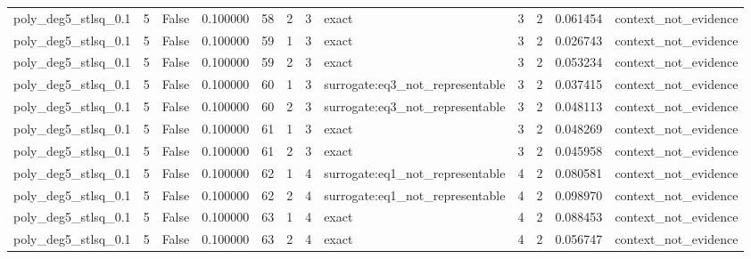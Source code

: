 \begin{tabular}{lrrrrrrlrrrl}
poly\_deg5\_stlsq\_0.1 & 5 & False & 0.100000 & 58 & 2 & 3 & exact & 3 & 2 & 0.061454 & context\_not\_evidence \\
poly\_deg5\_stlsq\_0.1 & 5 & False & 0.100000 & 59 & 1 & 3 & exact & 3 & 2 & 0.026743 & context\_not\_evidence \\
poly\_deg5\_stlsq\_0.1 & 5 & False & 0.100000 & 59 & 2 & 3 & exact & 3 & 2 & 0.053234 & context\_not\_evidence \\
poly\_deg5\_stlsq\_0.1 & 5 & False & 0.100000 & 60 & 1 & 3 & surrogate:eq3\_not\_representable & 3 & 2 & 0.037415 & context\_not\_evidence \\
poly\_deg5\_stlsq\_0.1 & 5 & False & 0.100000 & 60 & 2 & 3 & surrogate:eq3\_not\_representable & 3 & 2 & 0.048113 & context\_not\_evidence \\
poly\_deg5\_stlsq\_0.1 & 5 & False & 0.100000 & 61 & 1 & 3 & exact & 3 & 2 & 0.048269 & context\_not\_evidence \\
poly\_deg5\_stlsq\_0.1 & 5 & False & 0.100000 & 61 & 2 & 3 & exact & 3 & 2 & 0.045958 & context\_not\_evidence \\
poly\_deg5\_stlsq\_0.1 & 5 & False & 0.100000 & 62 & 1 & 4 & surrogate:eq1\_not\_representable & 4 & 2 & 0.080581 & context\_not\_evidence \\
poly\_deg5\_stlsq\_0.1 & 5 & False & 0.100000 & 62 & 2 & 4 & surrogate:eq1\_not\_representable & 4 & 2 & 0.098970 & context\_not\_evidence \\
poly\_deg5\_stlsq\_0.1 & 5 & False & 0.100000 & 63 & 1 & 4 & exact & 4 & 2 & 0.088453 & context\_not\_evidence \\
poly\_deg5\_stlsq\_0.1 & 5 & False & 0.100000 & 63 & 2 & 4 & exact & 4 & 2 & 0.056747 & context\_not\_evidence \\
\bottomrule
\end{tabular}
